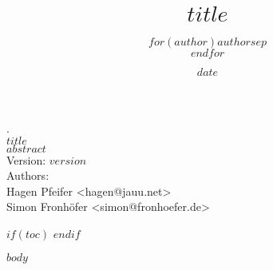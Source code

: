 \documentclass[
  10pt,
  parskip,
  a4paper,
  oneside,
]{scrartcl}
\title{$title$}
\author{$for(author)$$author$$sep$\\$endfor$}
\date{$date$}
\makeatletter
\def\maxwidth{\ifdim\Gin@nat@width>\linewidth\linewidth
\else\Gin@nat@width\fi}
\let\Oldincludegraphics\includegraphics
\renewcommand{\includegraphics}[1]{\Oldincludegraphics[width=\maxwidth]{#1}}
\makeatother
\begin{document}
\begin{titlepage}

	\begin{flushleft}
		{
		\sffamily
		.\\
		\vspace{8.0cm}
		{\Huge \color{MSBlue}\textbf{$title$}}\\
		\vspace{.5cm}
		\textit{
			$abstract$\\
			}
		\vspace{2.0cm}
		Version: $version$\\
		\vspace{1.0cm}
		Authors:\\
	Hagen Pfeifer <hagen@jauu.net>\\
	Simon Fronhöfer <simon@fronhoefer.de>\\
		}

	\vfill
	\end{flushleft}

\end{titlepage}

$if(toc)$
\setcounter{tocdepth}{2}
\tableofcontents
\newpage
$endif$

$body$
\end{document}
